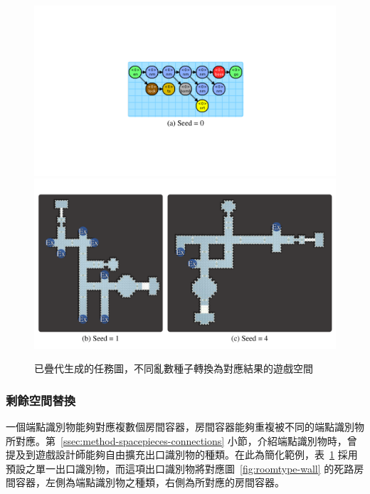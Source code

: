 \begin{figure}[!htb]
  \begin{center}
    \includegraphics[width=1.0\textwidth]{figures/mission-to-space-instruction-result.pdf}
    \includegraphics[width=1.0\textwidth]{figures/mission-to-space-instruction-result-.pdf}
    \caption{已疊代生成的任務圖，不同亂數種子轉換為對應結果的遊戲空間} 
    \label{fig:mission-to-space-instruction-result}
  \end{center}
\end{figure}

\subsubsection{剩餘空間替換}
\label{sssec:method-spacepieces-frommissiontospace-replacement}

一個端點識別物能夠對應複數個房間容器，房間容器能夠重複被不同的端點識別物所對應。第~\ref{ssec:method-spacepieces-connections} 小節，介紹端點識別物時，曾提及到遊戲設計師能夠自由擴充出口識別物的種類。在此為簡化範例，表~\ref{fig:mission-to-space-instruction-result} 採用預設之單一出口識別物，而這項出口識別物將對應圖~\ref{fig:roomtype-wall} 的死路房間容器，左側為端點識別物之種類，右側為所對應的房間容器。


